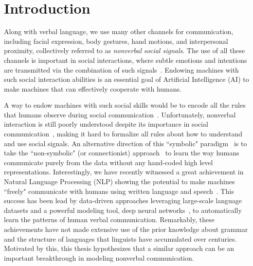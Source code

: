 
%
%	

\chapter{Introduction}
Along with verbal language, we use many other channels for communication, including facial expression, body gestures, hand motions, and interpersonal proximity, collectively referred to as \emph{nonverbal social signals}. The use of all these channels is important in social interactions, where subtle emotions and intentions are transmitted via the combination of such signals~\cite{Moore13}. Endowing machines with such social interaction abilities is an essential goal of Artificial Intelligence (AI) to make machines that can effectively cooperate with humans.%


A way to endow machines with such social skills would be to encode all the rules that humans observe during social communication~\cite{cassell1994animated, cassell2000embodied}. Unfortunately, nonverbal interaction is still poorly understood despite its importance in social communication~\cite{Mehrabian67,Mehrabian81,Birdwhistell-1970}, making it hard to formalize all rules about how to understand and use social signals. An alternative direction of this ``symbolic" paradigm~\cite{newell1976} is to take the ``non-symbolic" (or connectionist) approach~\cite{rumelhart1986parallel} to learn the way humans communicate purely from the data without any hand-coded high level representations. Interestingly, we have recently witnessed a great achievement in Natural Language Processing (NLP) showing the potential to make machines ``freely" communicate with humans using written language and speech~\cite{young2018recent}. This success has been lead by data-driven approaches leveraging large-scale language datasets and a powerful modeling tool, deep neural networks~\cite{lecun2015deep}, to automatically learn the patterns of human verbal communication. Remarkably, these achievements have not made extensive use of the prior knowledge about grammar and the structure of languages that linguists have accumulated over centuries. Motivated by this, this thesis hypothesizes that a similar approach can be an important breakthrough in modeling nonverbal communication. 

